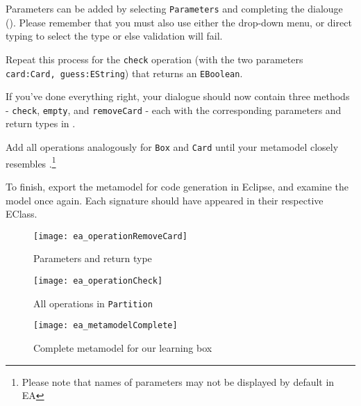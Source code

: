 \begin{stepbystep}
\item  Parameters can be added by selecting \texttt{Parameters} and
completing the dialouge (). Please remember that you must also use either the drop-down menu, or direct typing to select the type or else validation
will fail.

\item  Repeat this process for the \texttt{check} operation (with the two parameters \texttt{card:Card, guess:EString}) that returns an \texttt{EBoolean}. 

\item  If you've done everything right, your dialogue should now contain three methods - \texttt{check}, \texttt{empty}, and
\texttt{removeCard} - each with the corresponding parameters and return types in .


\item  Add all operations analogously for \texttt{Box} and \texttt{Card} until your metamodel closely resembles
.\footnote{Please note that names of parameters may not be displayed by default in EA}

\item  To finish, export the metamodel for code generation in Eclipse, and examine the model once again. Each signature should have
appeared in their respective EClass.

\newpage

\vspace*{1cm}

\begin{figure}[htbp]
	\centering
  \texttt{[image: ea\_operationRemoveCard]}
	\caption{Parameters and return type}
	\label{ea:operation_parameters}
\end{figure}

\vspace{1cm}

\begin{figure}[h!]
	\centering
  \texttt{[image: ea\_operationCheck]}
	\caption{All operations in \texttt{Partition}}
	\label{ea:operation_partition}
\end{figure}

\newpage


\begin{figure}[htbp]
	\centering
  \texttt{[image: ea\_metamodelComplete]}
\caption[Complete metamodel for our learning box.]{Complete metamodel for our learning box}
	\label{ea:metamodel_complete}
\end{figure}
\FloatBarrier

\end{stepbystep}

